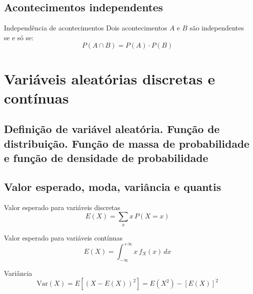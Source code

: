 \documentclass[a4paper,12pt]{article}
\begin{document}
\subsection{Acontecimentos independentes}

\begin{formulabox}{Independência de acontecimentos}
Dois acontecimentos $A$ e $B$ são independentes se e só se:
\begin{equation}\label{formula5}\tag{Fórmula 5}
    P(A \cap B) = P(A) \cdot P(B)
\end{equation}
\end{formulabox}

\newpage

\section{\color{sectioncolor}Variáveis aleatórias discretas e contínuas}
\subsection{Definição de variável aleatória. Função de distribuição. Função de massa de probabilidade e função de densidade de probabilidade}

\subsection{Valor esperado, moda, variância e quantis}

\begin{formulabox}{Valor esperado para variáveis discretas}
\begin{equation}\label{formula6}\tag{Fórmula 6}
    E(X) = \sum_{x} x \, P(X = x)
\end{equation}
\end{formulabox}

\begin{formulabox}{Valor esperado para variáveis contínuas}
\begin{equation}\label{formula7}\tag{Fórmula 7}
    E(X) = \int_{-\infty}^{+\infty} x \, f_X(x) \, dx
\end{equation}
\end{formulabox}

\begin{formulabox}{Variância}
\begin{equation}\label{formula8}\tag{Fórmula 8}
    \mathrm{Var}(X) = E[(X - E(X))^2] = E(X^2) - [E(X)]^2
\end{equation}
\end{formulabox}
\end{document}
